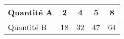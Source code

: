 
\begin{tabular}{|l|c|c|c|c|}
\hline
Quantité A & 2 & 4 & 5 & 8  \\ \hline
Quantité B & 18 & 32 & 47 & 64 \\ \hline
\end{tabular}

